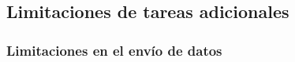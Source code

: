 \subsection{Limitaciones de tareas adicionales}

\subsubsection{Limitaciones en el envío de datos}


